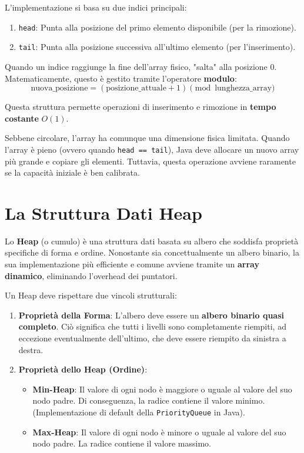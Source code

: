 L'implementazione si basa su due indici principali:
\begin{enumerate}
    \item \texttt{head}: Punta alla posizione del primo elemento disponibile (per la rimozione).
    \item \texttt{tail}: Punta alla posizione successiva all'ultimo elemento (per l'inserimento).
\end{enumerate}

Quando un indice raggiunge la fine dell'array fisico, "salta" alla posizione $0$. Matematicamente, questo è gestito tramite l'operatore \textbf{modulo}:
\[ \text{nuova\_posizione} = (\text{posizione\_attuale} + 1) \pmod{\text{lunghezza\_array}} \]

Questa struttura permette operazioni di inserimento e rimozione in \textbf{tempo costante} $O(1)$.

Sebbene circolare, l'array ha comunque una dimensione fisica limitata. Quando l'array è pieno (ovvero quando \texttt{head == tail}), Java deve allocare un nuovo array più grande e copiare gli elementi. Tuttavia, questa operazione avviene raramente se la capacità iniziale è ben calibrata.

\section{La Struttura Dati Heap}
\label{heap}

Lo \textbf{Heap} (o cumulo) è una struttura dati basata su albero che soddisfa proprietà specifiche di forma e ordine. Nonostante sia concettualmente un albero binario, la sua implementazione più efficiente e comune avviene tramite un \textbf{array dinamico}, eliminando l'overhead dei puntatori.

Un Heap deve rispettare due vincoli strutturali:

\begin{enumerate}
    \item \textbf{Proprietà della Forma}: L'albero deve essere un \textbf{albero binario quasi completo}. Ciò significa che tutti i livelli sono completamente riempiti, ad eccezione eventualmente dell'ultimo, che deve essere riempito da sinistra a destra.
    \item \textbf{Proprietà dello Heap (Ordine)}:
    \begin{itemize}
        \item \textbf{Min-Heap}: Il valore di ogni nodo è maggiore o uguale al valore del suo nodo padre. Di conseguenza, la radice contiene il valore minimo. (Implementazione di default della \texttt{PriorityQueue} in Java).
        \item \textbf{Max-Heap}: Il valore di ogni nodo è minore o uguale al valore del suo nodo padre. La radice contiene il valore massimo.
    \end{itemize}
\end{enumerate}

